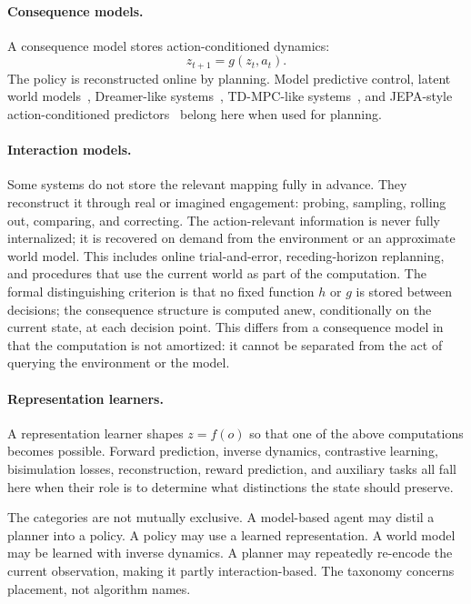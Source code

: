 \documentclass[11pt]{article}
\theoremstyle{remark}
\newcommand{\1}{\mathbb 1}
\begin{document}
\paragraph{Consequence models.}
A consequence model stores action-conditioned dynamics:
\begin{equation}
    z_{t+1}=g(z_t,a_t).
\end{equation}
The policy is reconstructed online by planning. Model predictive control, latent world models~\citep{Ha-world18}, Dreamer-like systems~\citep{Hafner-dream19,Hafner-dream20}, TD-MPC-like systems~\citep{Hansen-tdmpc22}, and JEPA-style action-conditioned predictors~\citep{LeCun-path22} belong here when used for planning.

\paragraph{Interaction models.}
Some systems do not store the relevant mapping fully in advance. They reconstruct it through real or imagined engagement: probing, sampling, rolling out, comparing, and correcting. The action-relevant information is never fully internalized; it is recovered on demand from the environment or an approximate world model. This includes online trial-and-error, receding-horizon replanning, and procedures that use the current world as part of the computation. The formal distinguishing criterion is that no fixed function $h$ or $g$ is stored between decisions; the consequence structure is computed anew, conditionally on the current state, at each decision point. This differs from a consequence model in that the computation is not amortized: it cannot be separated from the act of querying the environment or the model.

\paragraph{Representation learners.}
A representation learner shapes $z=f(o)$ so that one of the above computations becomes possible. Forward prediction, inverse dynamics, contrastive learning, bisimulation losses, reconstruction, reward prediction, and auxiliary tasks all fall here when their role is to determine what distinctions the state should preserve.

The categories are not mutually exclusive. A model-based agent may distil a planner into a policy. A policy may use a learned representation. A world model may be learned with inverse dynamics. A planner may repeatedly re-encode the current observation, making it partly interaction-based. The taxonomy concerns placement, not algorithm names.
\end{document}
